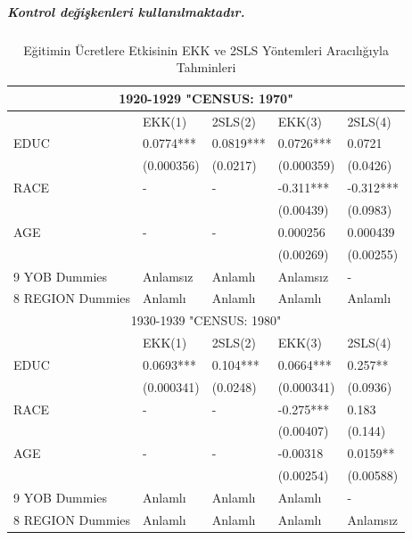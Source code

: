 \documentclass[12pt, a4paper, showtrims]{article}
\begin{document}
\begin{justify}
\begin{justify}
\begin{justify}
    \newpage
    \subparagraph{Kontrol değişkenleri kullanılmaktadır.}
    \begin{justify}
        \setlength{\parindent}{0em}

    \begin{table}[h]
        \centering
        \caption{Eğitimin Ücretlere Etkisinin EKK ve 2SLS Yöntemleri Aracılığıyla Tahminleri}
        \begin{tabular}{|p{4cm}||p{2.5cm}|p{2.5cm}||p{2.5cm}|p{2.5cm}|}   
            \hline
            \multicolumn{5}{|c|}{1920-1929 "CENSUS: 1970"} \\
         \hline
          & EKK(1) & 2SLS(2) & EKK(3) & 2SLS(4) \\ [0.5ex] 
         \hline
          EDUC & 0.0774***  & 0.0819*** &0.0726***     &  0.0721  \\ 
               & (0.000356) & (0.0217)  & (0.000359)   & (0.0426) \\
          RACE &  -         &  -        &-0.311***     & -0.312*** \\ 
               &            &           &(0.00439)     & (0.0983)\\
          AGE  &  -         &  -        &0.000256      & 0.000439 \\ 
               &            &           & (0.00269)    & (0.00255)\\
          9 YOB Dummies & Anlamsız &  Anlamlı & Anlamsız& -\\
          8 REGION Dummies & Anlamlı &  Anlamlı & Anlamlı & Anlamlı\\ 

        \hline
        \multicolumn{5}{|c|}{1930-1939 "CENSUS: 1980"} \\
         \hline
          & EKK(1) & 2SLS(2) & EKK(3) & 2SLS(4) \\ [0.5ex] 
         \hline
          EDUC &  0.0693*** & 0.104*** & 0.0664***  &  0.257**  \\ 
               &  (0.000341)& (0.0248) & (0.000341) & (0.0936) \\
          RACE &  -         &  -       & -0.275***  & 0.183 \\ 
               &            &          & (0.00407)  & (0.144)\\
          AGE  &  -         &  -       & -0.00318   & 0.0159** \\ 
               &            &          & (0.00254)  & (0.00588)\\
          9 YOB Dummies & Anlamlı &  Anlamlı & Anlamlı & -\\
          8 REGION Dummies & Anlamlı &  Anlamlı & Anlamlı & Anlamsız\\ 
 

\end{tabular}
\end{table}
\end{justify}
\end{justify}
\end{justify}
\end{justify}
\end{document}
